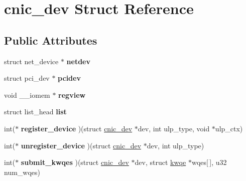 \hypertarget{structcnic__dev}{
\section{cnic\_\-dev Struct Reference}
\label{structcnic__dev}
}
\subsection*{Public Attributes}
\begin{DoxyCompactItemize}
\item 
\hypertarget{structcnic__dev_a9a29ef05becbd41053e5de60a8fde4da}{
struct net\_\-device $\ast$ {\bfseries netdev}}
\label{structcnic__dev_a9a29ef05becbd41053e5de60a8fde4da}

\item 
\hypertarget{structcnic__dev_a823e05958273f55c7989df74e9b45a3c}{
struct pci\_\-dev $\ast$ {\bfseries pcidev}}
\label{structcnic__dev_a823e05958273f55c7989df74e9b45a3c}

\item 
\hypertarget{structcnic__dev_afeabac65bccb6ad62c054c0195966681}{
void \_\-\_\-iomem $\ast$ {\bfseries regview}}
\label{structcnic__dev_afeabac65bccb6ad62c054c0195966681}

\item 
\hypertarget{structcnic__dev_a54b42c07177a34f6750184037222e9c6}{
struct list\_\-head {\bfseries list}}
\label{structcnic__dev_a54b42c07177a34f6750184037222e9c6}

\item 
\hypertarget{structcnic__dev_aa262fcdd6886372b5bcf720a282dcf40}{
int($\ast$ {\bfseries register\_\-device} )(struct \hyperlink{structcnic__dev}{cnic\_\-dev} $\ast$dev, int ulp\_\-type, void $\ast$ulp\_\-ctx)}
\label{structcnic__dev_aa262fcdd6886372b5bcf720a282dcf40}

\item 
\hypertarget{structcnic__dev_ab24a8debf274dac573e2bb5ff266898e}{
int($\ast$ {\bfseries unregister\_\-device} )(struct \hyperlink{structcnic__dev}{cnic\_\-dev} $\ast$dev, int ulp\_\-type)}
\label{structcnic__dev_ab24a8debf274dac573e2bb5ff266898e}

\item 
\hypertarget{structcnic__dev_ac66c85c0a192d46f337fb33f7e3639ca}{
int($\ast$ {\bfseries submit\_\-kwqes} )(struct \hyperlink{structcnic__dev}{cnic\_\-dev} $\ast$dev, struct \hyperlink{structkwqe}{kwqe} $\ast$wqes\mbox{[}$\,$\mbox{]}, u32 num\_\-wqes)}
\label{structcnic__dev_ac66c85c0a192d46f337fb33f7e3639ca}


\end{DoxyCompactItemize}
